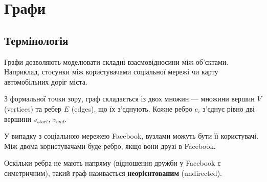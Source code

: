 \documentclass[12pt,a4paper]{report}
\begin{document}
\chapter{Графи}

\begingroup
\let\clearpage\relax
\tableofcontents
\endgroup

\pagebreak



\section{Термінологія}

Графи дозволяють моделювати складні взаємовідносини між об’єктами. Наприклад, стосунки між користувачами соціальної мережі чи карту автомобільних доріг міста.

З формальної точки зору, граф складається із двох множин --- множини вершин \(V\) (vertices) та ребер \(E\) (edges), що їх з’єднують. Кожне ребро \(e_i\) з’єднує рівно дві вершини \(v_{start}\), \(v_{end}\).

У випадку з соціальною мережею Facebook, вузлами можуть бути її користувачі. Між двома користувачами буде ребро, якщо вони друзі в Facebook.

\begin{center}
\end{center}

Оскільки ребра не мають напряму (відношення дружби у Facebook є симетричним), такий граф називається \textbf{неорієнтованим} (undirected).
\end{document}
